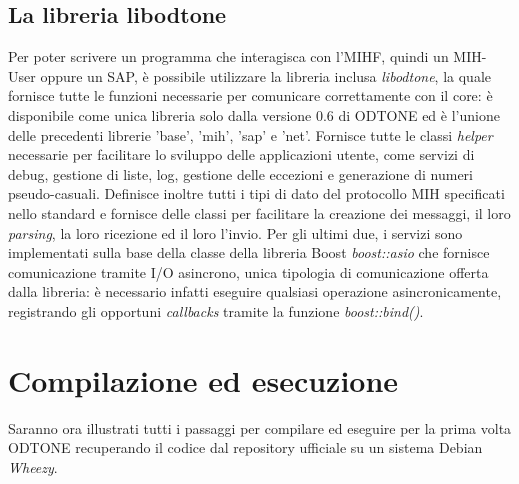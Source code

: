 \subsection{La libreria libodtone}
Per poter scrivere un programma che interagisca con l'MIHF, quindi un MIH-User oppure un SAP, è possibile utilizzare la libreria inclusa {\em libodtone}, la quale fornisce tutte le funzioni necessarie per comunicare correttamente con il core: è disponibile come unica libreria solo dalla versione 0.6 di ODTONE ed è l'unione delle precedenti librerie 'base', 'mih', 'sap' e 'net'\cite{changelog}. Fornisce tutte le classi {\em helper} necessarie per facilitare lo sviluppo delle applicazioni utente, come servizi di debug, gestione di liste, log, gestione delle eccezioni e generazione di numeri pseudo-casuali. Definisce inoltre tutti i tipi di dato del protocollo MIH specificati nello standard e fornisce delle classi per facilitare la creazione dei messaggi, il loro {\em parsing}, la loro ricezione ed il loro l'invio. Per gli ultimi due, i servizi sono implementati sulla base della classe della libreria Boost {\em boost::asio} che fornisce comunicazione tramite I/O asincrono, unica tipologia di comunicazione offerta dalla libreria: è necessario infatti eseguire qualsiasi operazione asincronicamente, registrando gli opportuni {\em callbacks} tramite la funzione {\em boost::bind()}.

\section{Compilazione ed esecuzione}
Saranno ora illustrati tutti i passaggi per compilare ed eseguire per la prima volta ODTONE recuperando il codice dal repository ufficiale su un sistema Debian\cite{debian} {\em Wheezy}.

